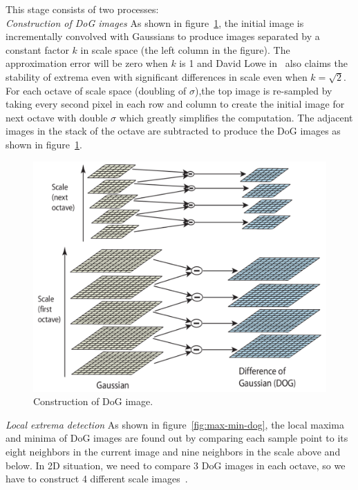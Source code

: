 \begin{enumerate}
\noindent This stage consists of two processes:\\
\textit{Construction of DoG images} As shown in figure~\ref{fig:dog-const}, the initial image is incrementally convolved with Gaussians to produce images separated by a constant factor $k$ in scale space (the left column in the figure). The approximation error will be zero when $k$ is 1 and David Lowe in~\cite{Lowe:04} also claims the stability of extrema even with significant differences in scale even when $k=\sqrt{2}$. For each octave of scale space (doubling of $\sigma$),the top image is re-sampled by taking every second pixel in each row and column to create the initial image for next octave with double $\sigma$ which greatly simplifies the computation. The adjacent images in the stack of the octave are subtracted to produce the DoG images as shown in figure~\ref{fig:dog-const}.\\

\begin{figure}[H]%
\centering
\includegraphics[width=0.9\columnwidth]{2.mainmatter/2.Methodology/FeaturesExtraction/figures/SIFT/difference-of-gaussian}%
\caption[Construction of DoG Image]{Construction of DoG image. }%
\label{fig:dog-const}%
\end{figure}

\textit{Local extrema detection} As shown in figure~\ref{fig:max-min-dog}, the local maxima and minima of DoG images are found out by comparing each sample point to its eight neighbors in the current image and nine neighbors in the scale above and below. In 2D situation, we need to compare 3 DoG images in each octave, so we have to construct 4 different scale images~\cite{Li:11}.


\end{enumerate}
